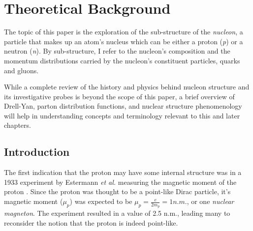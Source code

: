\chapter{Theoretical Background}

The topic of this paper is the exploration of the sub-structure of the \emph{nucleon}, a particle that makes up an atom's nucleus which can be either a proton (\emph{p}) or a neutron (\emph{n}). By sub-structure, I refer to the nucleon's composition and the momentum distributions carried by the nucleon's constituent particles, quarks and gluons.

While a complete review of the history and physics behind nucleon structure and its investigative probes is beyond the scope of this paper, a brief overview of Drell-Yan, parton distribution functions, and nuclear structure phenomenology will help in understanding concepts and terminology relevant to this and later chapters.

\section{Introduction}

The first indication that the proton may have some internal structure was in a 1933 experiment by Estermann \emph{et al.} measuring the magnetic moment of the proton \cite{Estermann:169E}. Since the proton was thought to be a point-like Dirac particle, it's magnetic moment ($\mu_p$) was expected to be $\mu_p = \frac{e}{2 m_p} = 1 n.m.$, or one \emph{nuclear magneton}. The experiment resulted in a value of 2.5 n.m., leading many to reconsider the notion that the proton is indeed point-like.

